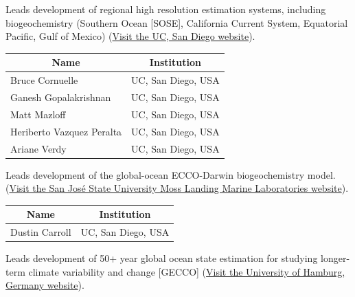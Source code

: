 \newpage
Leads development of regional high resolution estimation systems, including biogeochemistry (Southern Ocean [SOSE], California Current System, Equatorial Pacific, Gulf of Mexico) (\hyperlink{https://scripps.ucsd.edu/}{Visit the UC, San Diego website}).

\begin{center}
\begin{tabular}{m{} m{} }
    \multicolumn{1}{c}{\textbf{Name}} & \multicolumn{1}{c}{\textbf{Institution}} \\ \hline
    Bruce Cornuelle & UC, San Diego, USA \\ \hline
    Ganesh Gopalakrishnan  & UC, San Diego, USA \\ \hline
    Matt Mazloff  & UC, San Diego, USA \\ \hline
    Heriberto Vazquez Peralta  & UC, San Diego, USA \\ \hline
    Ariane Verdy  & UC, San Diego, USA \\ \hline
\end{tabular}
\end{center}

\vspace{.25cm}
Leads development of the global-ocean ECCO-Darwin biogeochemistry model.(\hyperlink{https://mlml.sjsu.edu/}{Visit the San José State University Moss Landing Marine Laboratories website}).

\begin{center}
\begin{tabular}{m{} m{} }
    \multicolumn{1}{c}{\textbf{Name}} & \multicolumn{1}{c}{\textbf{Institution}} \\ \hline
    Dustin Carroll  & UC, San Diego, USA \\ \hline 
\end{tabular}
\end{center}

\vspace{.25cm}
Leads development of 50+ year global ocean state estimation for studying longer-term climate variability and change [GECCO] (\hyperlink{https://www.oden.utexas.edu/}{Visit the University of Hamburg, Germany website}).

